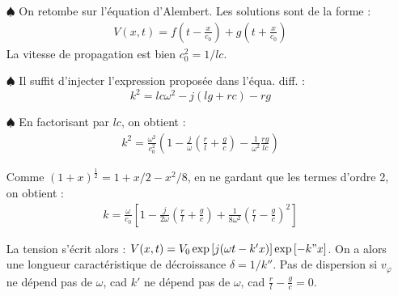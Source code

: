 \documentclass{report}
\begin{document}
\begin{itemize}
	\item[$\spadesuit$] On retombe sur l'équation d'Alembert. Les solutions sont de la forme :
	\begin{align*}
		V(x,t)=f\left(t-\frac{x}{c_0} \right) + g\left(t+\frac{x}{c_0} \right) 
	\end{align*}
	La vitesse de propagation est bien $c_0^2=1/lc$.
	\item[$\spadesuit$] Il suffit d'injecter l'expression proposée dans l'équa. diff. :
	\begin{equation}
		k^2=lc\omega^2-j(lg+rc)-rg
	\end{equation}

 \item[$\spadesuit$] En factorisant par $lc$, on obtient :
 \begin{align*}
 	k^2=\frac{\omega^2}{c_0^2}\left(1 - \frac{j}{\omega}\left( \frac{r}{l}+\frac{g}{c}\right)  - \frac{1}{\omega^2}\frac{rg}{lc}\right) 
 \end{align*}

Comme $(1+x)^\frac{1}{2}=1+x/2-x^2/8$, en ne gardant que les termes d'ordre 2, on obtient : 
\begin{align*}
	k=\frac{\omega}{c_0}\left[1-\frac{j}{2\omega}\left( \frac{r}{l}+\frac{g}{c}\right)+\frac{1}{8\omega^2}\left( \frac{r}{l}-\frac{g}{c}\right)^2 \right] 
\end{align*}

La tension s'écrit alors : $V(x,t)=V_0\exp\left[j(\omega t - k'x )\right]\exp\left[-k"x \right]$. On a alors une longueur caractéristique de décroissance $\delta=1/k''$. Pas de dispersion si $v_\varphi$ ne dépend pas de $\omega$, cad $k'$ ne dépend pas de $\omega$, cad $\frac{r}{l}-\frac{g}{c}=0$.

\end{itemize}
\end{document}
